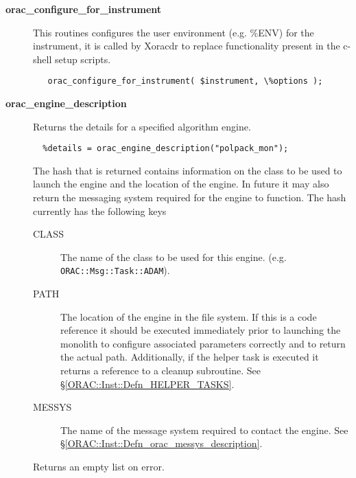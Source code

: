 \begin{description}
\item[{\textbf{orac\_configure\_for\_instrument}}] \mbox{}

This routines configures the user environment (e.g. \%ENV) for the instrument, 
it is called by Xoracdr to replace functionality present in the c-shell setup scripts.

\begin{verbatim}
   orac_configure_for_instrument( $instrument, \%options );
\end{verbatim}

\item[{\textbf{orac\_engine\_description}}] \mbox{}

Returns the details for a specified algorithm engine.

\begin{verbatim}
  %details = orac_engine_description("polpack_mon");
\end{verbatim}


The hash that is returned contains information on the
class to be used to launch the engine and the location
of the engine. In future it may also return the messaging
system required for the engine to function. The hash currently
has the following keys

\begin{description}

\item[{CLASS}] \mbox{}

The name of the class to be used for this engine.
(e.g. \texttt{ORAC::Msg::Task::ADAM}).


\item[{PATH}] \mbox{}

The location of the engine in the file system. If this
is a code reference it should be executed immediately
prior to launching the monolith to configure associated
parameters correctly and to return the actual path.
Additionally, if the helper task is executed it returns
a reference to a cleanup subroutine. See \S\ref{ORAC::Inst::Defn_HELPER_TASKS}.


\item[{MESSYS}] \mbox{}

The name of the message system required to contact the engine.
See \S\ref{ORAC::Inst::Defn_orac_messys_description}.

\end{description}


Returns an empty list on error.




\end{description}
